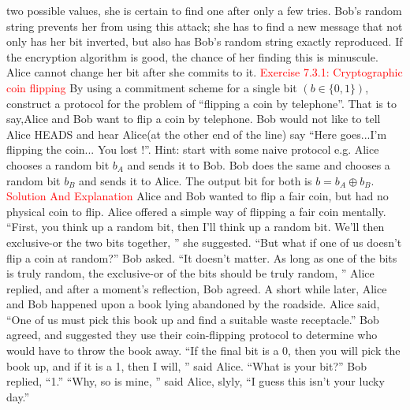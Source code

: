 \documentclass{article}
\newcommand*\xor{\mathbin{\oplus}}
\begin{document}
two possible values, she is certain to find one after only a few tries. Bob’s
random string prevents her from using this attack; she has to find a new
message that not only has her bit inverted, but also has Bob’s random string
exactly reproduced. If the encryption algorithm is good, the chance of her
finding this is minuscule. Alice cannot change her bit after she commits to it.
\newline\newline \textcolor{red}{Exercise 7.3.1: Cryptographic coin flipping}
\newline By using a commitment scheme for a single bit $(b \in \{0,1\})$, construct  a  protocol  for  the  problem  of  “flipping  a  coin  by  telephone”.   That  is  to  say,Alice and Bob want to flip a coin by telephone. Bob would not like to tell Alice HEADS and  hear Alice(at the other end of the line) say “Here goes...I’m flipping the coin...  You lost !”. Hint:  start with some naive protocol e.g. Alice chooses a random bit $b_A$ and sends it to Bob. Bob does the same and chooses a random bit $b_B$ and sends it to Alice.  The output bit for both is $b=b_A \xor b_B$.
\newline \textcolor{red}{Solution And Explanation}
\newline Alice and Bob wanted to flip a fair coin, but had no physical coin to flip. Alice offered a simple way of flipping a fair coin mentally.
“First, you think up a random bit, then I’ll think up a random bit.
We’ll then exclusive-or the two bits together, ” she suggested.
“But what if one of us doesn’t flip a coin at random?” Bob asked.
“It doesn’t matter. As long as one of the bits is truly random, the
exclusive-or of the bits should be truly random, ” Alice replied,
and after a moment’s reflection, Bob agreed.
A short while later, Alice and Bob happened upon a book lying abandoned by the roadside. Alice said, “One of us must pick this book up and find a suitable waste receptacle.” Bob agreed, and suggested they use
their coin-flipping protocol to determine who would have to
throw the book away.
“If the final bit is a 0, then you will pick the book up, and if it is a
1, then I will, ” said Alice. “What is your bit?”
Bob replied, “1.”
“Why, so is mine, ” said Alice, slyly, “I guess this isn’t your
lucky day.”
\end{document}
